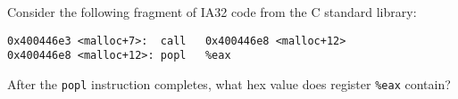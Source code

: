 \begin{problem}{4}

Consider the following fragment of IA32 code from the C standard library:

\begin{verbatim}
0x400446e3 <malloc+7>:	call   0x400446e8 <malloc+12>
0x400446e8 <malloc+12>:	popl   %eax
\end{verbatim}

After the {\tt popl} instruction completes, what hex value does
register {\tt \%eax} contain?

\end{problem}

